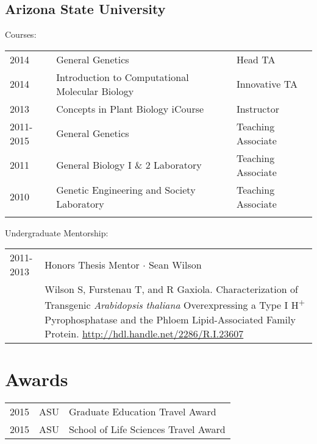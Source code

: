 \documentclass[11pt]{article}
\begin{document}
\subsection*{Arizona State University}
Courses:\\
\begin{tabularx}{\linewidth}{llX}
2014&General Genetics& Head TA\\
2014& Introduction to Computational Molecular Biology& Innovative TA\\
2013&Concepts in Plant Biology iCourse& Instructor\\
2011-2015&General Genetics&Teaching Associate\\
2011&General Biology I \& 2 Laboratory& Teaching Associate\\
2010&Genetic Engineering and Society Laboratory&Teaching Associate\\\\
\end{tabularx}
Undergraduate Mentorship:\\
\begin{tabularx}{\linewidth}{lX}
2011-2013&Honors Thesis Mentor $\cdotp$ Sean Wilson\\
&Wilson S, Furstenau T, and R Gaxiola. Characterization of Transgenic \textit{Arabidopsis thaliana} Overexpressing a Type I H\textsuperscript{+} Pyrophosphatase and the Phloem Lipid-Associated Family Protein. \href{http://hdl.handle.net/2286/R.I.23607}{http://hdl.handle.net/2286/R.I.23607}\\
\end{tabularx}


\section*{Awards}
\begin{tabularx}{\linewidth}{llX}
2015 & ASU &Graduate Education Travel Award\\
2015 & ASU &School of Life Sciences Travel Award\\
\end{tabularx}

\end{document}
